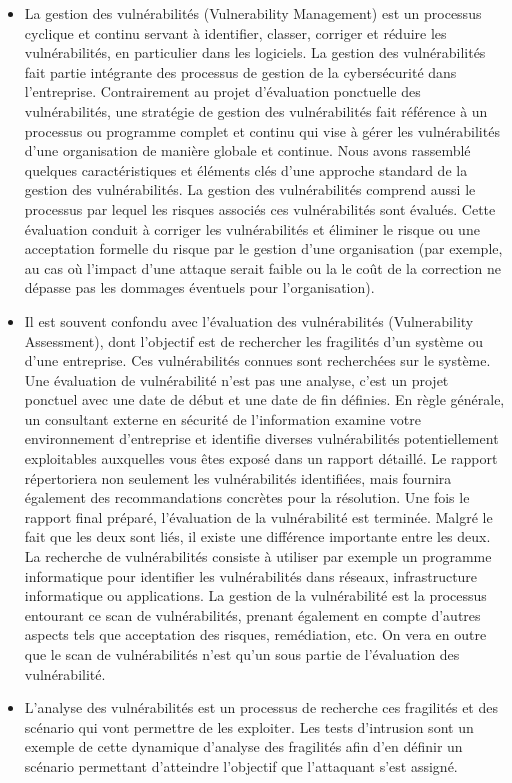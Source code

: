 \begin{itemize}
\item La gestion des vulnérabilités (Vulnerability Management) est un processus cyclique et continu servant à identifier, classer, corriger et réduire les vulnérabilités, en particulier dans les logiciels. La gestion des vulnérabilités fait partie intégrante des processus de gestion de la cybersécurité dans l’entreprise. Contrairement au projet d’évaluation ponctuelle des vulnérabilités, une stratégie de gestion des vulnérabilités fait référence à un processus ou programme complet et continu qui vise à gérer les vulnérabilités d’une organisation de manière globale et continue. Nous avons rassemblé quelques caractéristiques et éléments clés d’une approche standard de la gestion des vulnérabilités.
La gestion des vulnérabilités comprend aussi le processus par lequel  les risques associés ces vulnérabilités sont évalués. Cette évaluation conduit à corriger les vulnérabilités et éliminer le risque ou une acceptation formelle du risque par le gestion d’une organisation (par exemple, au cas où l’impact d’une attaque serait faible ou la le coût de la correction ne dépasse pas les dommages éventuels pour l’organisation).
\item Il est souvent confondu avec l’évaluation des vulnérabilités (Vulnerability Assessment), dont l’objectif est de rechercher les fragilités d’un système ou d’une entreprise. Ces vulnérabilités connues sont recherchées sur le système. Une évaluation de vulnérabilité n'est pas une analyse, c'est un projet ponctuel avec une date de début et une date de fin définies. En règle générale, un consultant externe en sécurité de l'information examine votre environnement d'entreprise et identifie diverses vulnérabilités potentiellement exploitables auxquelles vous êtes exposé dans un rapport détaillé. Le rapport répertoriera non seulement les vulnérabilités identifiées, mais fournira également des recommandations concrètes pour la résolution. Une fois le rapport final préparé, l'évaluation de la vulnérabilité est terminée.
Malgré le fait que les deux sont liés, il existe une différence importante entre les deux. La recherche de vulnérabilités consiste à utiliser par exemple un programme informatique pour identifier les vulnérabilités dans réseaux, infrastructure informatique ou applications. La gestion de la vulnérabilité est la processus entourant ce scan de vulnérabilités, prenant également en compte d’autres aspects tels que acceptation des risques, remédiation, etc. On vera en outre que le scan de vulnérabilités n’est qu’un sous partie de l’évaluation des vulnérabilité.
\item L’analyse des vulnérabilités est un processus de recherche ces fragilités et des scénario qui vont permettre de les exploiter. Les tests d’intrusion sont un exemple de cette dynamique d’analyse des fragilités afin d’en définir un scénario permettant d’atteindre l’objectif que l’attaquant s’est assigné.
\end{itemize}



